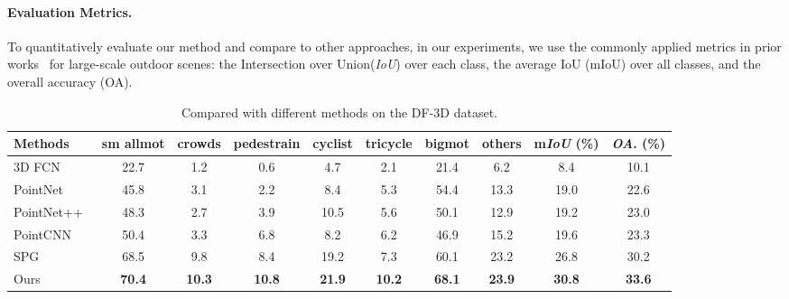 \documentclass{sip}%
\begin{document}
\paragraph{Evaluation Metrics.}
To quantitatively evaluate our method and compare to other approaches, in our experiments, we use the commonly applied metrics in prior works~\cite{hackel2017semantic3d} for large-scale outdoor scenes: the Intersection over Union(\emph{IoU}) over each class, the average IoU (mIoU) over all classes, and the overall accuracy (OA).

\begin{table}[!t]
\caption{Compared with different methods on the DF-3D dataset.}
\label{diff method}
\setlength{\tabcolsep}{6pt}
\begin{center}
{\begin{tabular}{lccccccc|cc}
\hline
 Methods& sm allmot & crowds & pedestrain & cyclist &tricycle & bigmot &others & m\emph{IoU} (\%) & \emph{OA}. (\%)  \\
\hline
3D FCN~\cite{li20173d} & 22.7 &1.2  &0.6  &4.7  &2.1 &21.4  &6.2  &8.4 &10.1 \\
PointNet~\cite{qi2017pointnet} & 45.8 &3.1  &2.2  &8.4  & 5.3&54.4  & 13.3 &19.0 &22.6 \\
PointNet++~\cite{qi2017pointnet++} &48.3  &2.7  &3.9  &10.5  &5.6 &50.1  &12.9  &19.2 &23.0 \\
PointCNN~\cite{li2018pointcnn} & 50.4 & 3.3 &6.8  &8.2  &6.2 &46.9  &15.2  &19.6 &23.3 \\
SPG~\cite{landrieu2018large} & 68.5 & 9.8 & 8.4 & 19.2 & 7.3& 60.1 & 23.2 & 26.8&30.2 \\
Ours & \textbf{70.4} & \textbf{10.3} & \textbf{10.8} & \textbf{21.9} & \textbf{10.2} & \textbf{68.1} & \textbf{23.9} & \textbf{30.8} &\textbf{33.6} \\
\hline
\end{tabular}}{}
\end{center}\vspace{-2mm}
\end{table}
\end{document}
